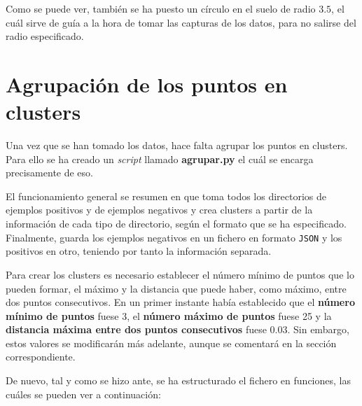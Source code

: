 \documentclass[11pt,a4paper]{article}
\begin{document}
Como se puede ver, también se ha puesto un círculo en el suelo de radio $3.5$, el cuál sirve
de guía a la hora de tomar las capturas de los datos, para no salirse del radio especificado.

\section{Agrupación de los puntos en clusters}

Una vez que se han tomado los datos, hace falta agrupar los puntos en clusters. Para
ello se ha creado un \textit{script} llamado \textbf{agrupar.py} el cuál se encarga
precisamente de eso.

El funcionamiento general se resumen en que toma todos los directorios de ejemplos positivos
y de ejemplos negativos y crea clusters a partir de la información de cada tipo de directorio,
según el formato que se ha especificado.
Finalmente, guarda los ejemplos negativos en un fichero en formato \texttt{JSON} y los positivos
en otro, teniendo por tanto la información separada.

Para crear los clusters es necesario establecer el número mínimo de puntos que lo pueden formar,
el máximo y la distancia que puede haber, como máximo, entre dos puntos consecutivos.
En un primer instante había establecido que el \textbf{número mínimo de puntos} fuese 3,
el \textbf{número máximo de puntos} fuese 25 y la \textbf{distancia máxima entre dos puntos consecutivos}
fuese $0.03$. Sin embargo, estos valores se modificarán más adelante, aunque se comentará
en la sección correspondiente.

De nuevo, tal y como se hizo ante, se ha estructurado el fichero en funciones, las cuáles
se pueden ver a continuación:
\end{document}
